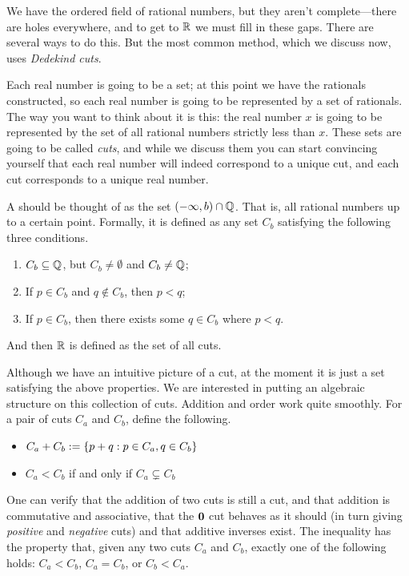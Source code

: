\begin{proofsketch}
  We have the ordered field of rational numbers, but they aren't
  complete—there are holes everywhere, and to get to $\mathbb R$ we must
  fill in these gaps. There are several ways to do this. But the most
  common method, which we discuss now, uses \textit{Dedekind cuts}.

  Each real number is going to be a set; at this point we have the
  rationals constructed, so each real number is going to be
  represented by a set of rationals. The way you want to think about
  it is this: the real number $x$ is going to be represented by the
  set of all rational numbers strictly less than $x$. These sets are
  going to be called \textit{cuts}, and while we discuss them you can
  start convincing yourself that each real number will indeed
  correspond to a unique cut, and each cut corresponds to a unique real number.

  \begin{definition}
    A  should be thought of as the set $(-\infty, b) \cap
    \mathbb Q$. That is, all rational numbers up to a certain point.
    Formally, it is defined as any set $C_b$ satisfying the following
    three conditions.
    \begin{enumerate}
      \item $C_b \subseteq \mathbb Q$, but $C_b \neq \emptyset$ and $C_b \neq \mathbb Q$;
      \item If $p \in C_b$ and $q \notin C_b$, then $p < q$;
      \item If $p \in C_b$, then there exists some $q \in C_b$ where $p < q$.
    \end{enumerate}
  \end{definition}

  And then $\mathbb R$ is defined as the set of all cuts.

  Although we have an intuitive picture of a cut, at the moment it is
  just a set satisfying the above properties. We are interested in
  putting an algebraic structure on this collection of cuts. Addition
  and order work quite smoothly. For a pair of cuts $C_a$ and $C_b$,
  define the following.
  \begin{itemize}
    \item $C_a + C_b := \{ p + q : p \in C_a, q \in C_b \}$
    \item $C_a < C_b$ if and only if $C_a \subsetneq C_b$
  \end{itemize}

  One can verify that the addition of two cuts is still a cut, and
  that addition is commutative and associative, that the $\textbf{0}$ cut
  behaves as it should (in turn giving \textit{positive} and
  \textit{negative} cuts) and that additive inverses exist. The
  inequality has the property that, given any two cuts $C_a$ and
  $C_b$, exactly one of the following holds: $C_a < C_b$, $C_a =
  C_b$, or $C_b < C_a$.


\end{proofsketch}
